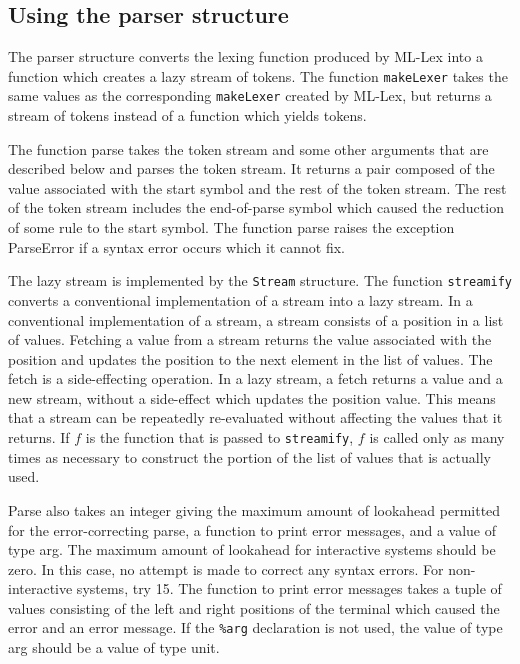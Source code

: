 \documentclass{article}
\begin{document}
\subsection{Using the parser structure}

The parser structure converts the lexing function produced by
ML-Lex into a function which creates a lazy stream of tokens.  The
function {\tt makeLexer} takes the same values as the corresponding
{\tt makeLexer} created by ML-Lex, but returns a stream of tokens
instead of a function which yields tokens.

The function parse takes the token stream and some other arguments that
are described below and parses the token stream.  It returns a pair composed
of the value associated with the start symbol and the rest of
the token stream.  The rest of the token stream includes the
end-of-parse symbol which caused the reduction of some rule
to the start symbol.  The function parse raises the
exception ParseError if a syntax error occurs which it cannot fix.

The lazy stream is implemented by the {\tt Stream} structure.
The function {\tt streamify} converts a conventional implementation
of a stream into a lazy stream.  In a conventional implementation
of a stream, a stream consists of a position in a list of
values.  Fetching a value from a stream returns the
value associated with the position and updates the position to
the next element in the list of values.  The fetch is a side-effecting
operation.  In a lazy stream, a fetch returns a value and a new
stream, without a side-effect which updates the position value.
This means that a stream can be repeatedly re-evaluated without
affecting the values that it returns.  If $f$ is the function
that is passed to {\tt streamify}, $f$ is called only as many
times as necessary to construct the portion of the list of values
that is actually used.

Parse also takes an integer giving the maximum amount of lookahead permitted
for the error-correcting parse, a function to print error messages,
and a value of type arg.  The maximum amount of lookahead for interactive
systems should be zero.  In this case, no attempt is made to correct any
syntax errors.  For non-interactive systems, try 15.  The
function to print error messages takes a tuple of values consisting
of the left and right positions of the terminal which caused the error
and an error message.   If the {\tt \%arg} declaration is not used, the
value of type arg should be a value of type unit.
\end{document}
